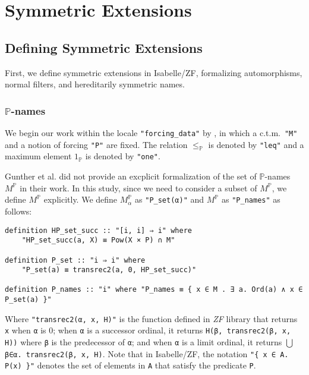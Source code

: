 \documentclass{report}
\newenvironment{isaframe}{\begin{mdframed}[topline=false, rightline=false, bottomline=false]}{\end{mdframed}}
\begin{document}
\section{Symmetric Extensions}


\subsection{Defining Symmetric Extensions}
First, we define symmetric extensions in Isabelle/ZF,
formalizing automorphisms, normal filters, and hereditarily symmetric names.


\subsubsection{$\mathbb{P}$-names}
We begin our work within the locale \texttt{"forcing\_data"} by \cite{gunther_forcing}, 
in which a c.t.m.\  \texttt{"M"} and a notion of forcing \texttt{"P"} are fixed.
The relation $\leq_{\mathbb{P}}$ is denoted by \texttt{"leq"} and 
a maximum element $1_{\mathbb{P}}$ is denoted by \texttt{"one"}.

Gunther et al. did not provide an excplicit formalization of the set of $\mathbb{P}$-names $M^{\mathbb{P}}$ in their work.
In this study, since we need to consider a subset of $M^{\mathbb{P}}$, we define $M^{\mathbb{P}}$ explicitly.
We define $M^{\mathbb{P}}_{\alpha}$ as \texttt{"P\_set(α)"} and $M^{\mathbb{P}}$ as \texttt{"P\_names"} as follows:

\begin{isaframe}
\begin{verbatim}
definition HP_set_succ :: "[i, i] ⇒ i" where 
    "HP_set_succ(a, X) ≡ Pow(X × P) ∩ M" 

definition P_set :: "i ⇒ i" where 
    "P_set(a) ≡ transrec2(a, 0, HP_set_succ)" 

definition P_names :: "i" where "P_names ≡ { x ∈ M . ∃ a. Ord(a) ∧ x ∈ P_set(a) }" 
\end{verbatim}
\end{isaframe} 

Where \texttt{"transrec2(α, x, H)"} is the function defined in \emph{ZF} library
that returns \texttt{x} when \texttt{α} is 0;
when \texttt{α} is a successor ordinal, it returns \texttt{H(β, transrec2(β, x, H))} where \texttt{β} is the predecessor of \texttt{α};
and when \texttt{α} is a limit ordinal, it returns $\bigcup$\texttt{β∈α. transrec2(β, x, H)}.
Note that in Isabelle/ZF, the notation \texttt{"\{ x ∈ A. P(x) \}"} denotes
the set of elements in \texttt{A} that satisfy the predicate \texttt{P}.
\end{document}
